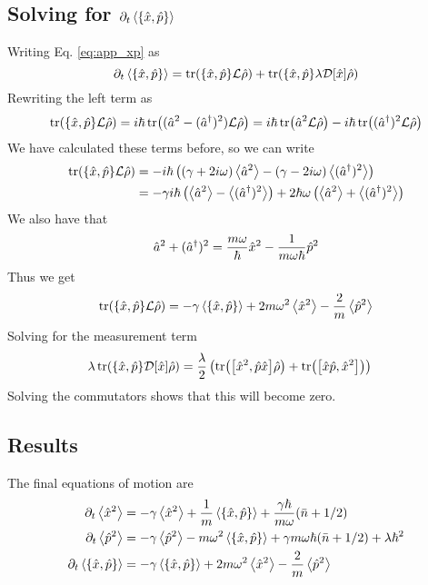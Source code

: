 \subsection{Solving for $\dt\expval{\acomm{\xop}{\pop}}$}
Writing Eq. \eqref{eq:app_xp} as
\begin{equation}
    \dt\expval{\acomm{\xop}{\pop}} = \tr(\acomm{\xop}{\pop} \liouvillian \dmatrix) + \tr(\acomm{\xop}{\pop} \lambda \super{\xop} \dmatrix)
\end{equation}
Rewriting the left term as 
\begin{equation}
    \tr(\acomm{\xop}{\pop}\liouvillian \dmatrix) = i\hbar \tr((\a^2 - (\ad)^2)\liouvillian \dmatrix) = i\hbar \tr(\a^2 \liouvillian \dmatrix) - i\hbar \tr((\ad)^2 \liouvillian \dmatrix)
\end{equation}
We have calculated these terms before, so we can write
\begin{align}
    \tr(\acomm{\xop}{\pop}\liouvillian \dmatrix) &= -i\hbar \left(  (\gamma + 2i\omega) \expval{\a^2} - (\gamma - 2 i \omega) \expval{(\ad)^2} \right)\\
    &= -\gamma  i\hbar \left( \expval{\a^2} - \expval{(\ad)^2} \right) + 2\hbar\omega \left(\expval{\a^2} + \expval{(\ad)^2} \right)
\end{align}
We also have that
\begin{equation}
    \hat{a}^2 +(\hat{a}^{\dagger})^2 = \frac{m\omega}{\hbar} \hat{x}^2 - \frac{1}{m\omega \hbar} \hat{p}^2
\end{equation}
Thus we get
\begin{equation}
    \tr(\acomm{\xop}{\pop}\liouvillian \dmatrix) =  -\gamma \expval{\acomm{\xop}{\pop}} + 2 m \omega^2 \expval{\xop^2} - \frac{2}{m} \expval{\pop^2}
\end{equation}
Solving for the measurement term
\begin{align}
    \lambda \tr(\acomm{\xop}{\pop}\super{\xop} \dmatrix) &= \frac{\lambda}{2} \left( \tr(\comm{\xop^2}{\pop\xop}\dmatrix) + \tr(\comm{\xop\pop}{\xop^2}) \right)
\end{align}
Solving the commutators shows that this will become zero.

\subsection{Results}
The final equations of motion are
\begin{align}
    \dt\expval{\xop^2} &= - \gamma \expval{\xop^2} + \frac{1}{m}\expval{\acomm{\xop}{\pop}} + \frac{\gamma \hbar}{m\omega}(\nbar + 1/2)\\
    \dt\expval{\pop^2} &= -\gamma \expval{\pop^2} - m\omega^2 \expval{\acomm{\xop}{\pop}} + \gamma m \omega\hbar (\nbar + 1/2) + \lambda \hbar^2\\
    \dt\expval{\acomm{\xop}{\pop}} &= -\gamma \expval{\acomm{\xop}{\pop}} + 2 m \omega^2 \expval{\xop^2} - \frac{2}{m} \expval{\pop^2}
\end{align}